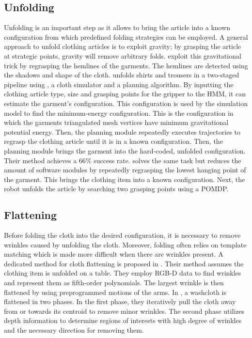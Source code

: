 \documentclass[\home/main.tex]{subfiles}
\begin{document}
\subsection{Unfolding}
Unfolding is an important step as it allows to bring the article into a known configuration from which predefined folding strategies can be employed. A general approach to unfold clothing articles is to exploit gravity; by grasping the article at strategic points, gravity will remove arbitrary folds. \Textcite{Hamajima1998} exploit this gravitational trick by regrasping the hemlines of the garments. The hemlines are detected using the shadows and shape of the cloth. \textcite{Cusumano2011} unfolds shirts and trousers in a two-staged pipeline using , a cloth simulator and a planning algorithm. By inputting the clothing article type, size and grasping points for the gripper to the \acrshort{HMM}, it can estimate the garment's configuration. This configuration is used by the simulation model to find the minimum-energy configuration. This is the configuration in which the garments triangulated mesh vertices have minimum gravitational potential energy. Then, the planning module repeatedly executes trajectories to regrasp the clothing article until it is in a known configuration. Then, the planning module brings the garment into the hard-coded, unfolded configuration. Their method achieves a $66\%$ success rate. \textcite{Doumanoglou2014} solves the same task but reduces the amount of software modules by repeatedly regrasping the lowest hanging point of the garment. This brings the clothing item into a known configuration. Next, the robot unfolds the article by searching two grasping points using a \acrshort{POMDP}.

\subsection{Flattening}
Before folding the cloth into the desired configuration, it is necessary to remove wrinkles caused by unfolding the cloth. Moreover, folding often relies on template matching which is made more difficult when there are wrinkles present. A dedicated method for cloth flattening is proposed in \autocite{Sun2015}. Their method assumes the clothing item is unfolded on a table. They employ RGB-D data to find wrinkles and represent them as fifth-order polynomials. The largest wrinkle is then flattened by using preprogrammed motions of the arms. In \autocite{Willimon2011}, a washcloth is flattened in two phases. In the first phase, they iteratively pull the cloth away from or towards its centroid to remove minor wrinkles. The second phase utilizes depth information to determine regions of interests with high degree of wrinkles and the necessary direction for removing them.
\end{document}
